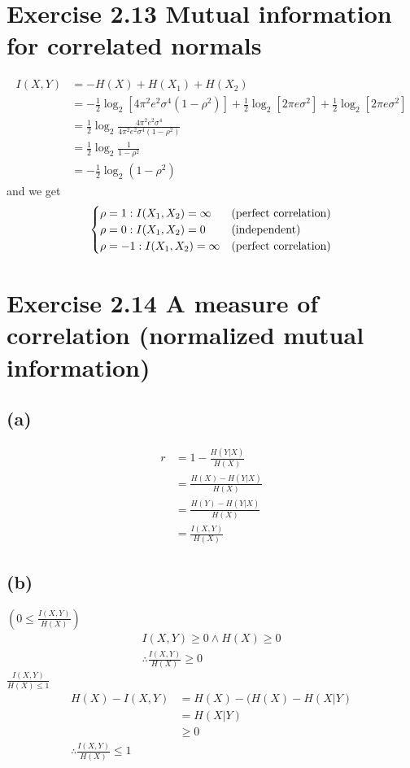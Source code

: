 \documentclass{jsarticle}
\begin{document}
\section*{Exercise 2.13 Mutual information for correlated normals}
\begin{align}
I(X,Y) & = -H(X) + H(X_1) + H(X_2)\\
& = -\frac{1}{2}\log_2 [4\pi^2 e^2 \sigma^4 (1-\rho^2)] + \frac{1}{2}\log_2 [2 \pi e \sigma^2] + \frac{1}{2}\log_2 [2\pi e \sigma^2 ]\\
& = \frac{1}{2}\log_2{\frac{4\pi^2e^2\sigma^4}{4\pi^2e^2\sigma^4(1-\rho^2)}}\\
& = \frac{1}{2}\log_2 \frac{1}{1 - \rho^2}\\
& = -\frac{1}{2}\log_2(1-\rho^2)
\end{align}
and we get 
\begin{align}
\begin{cases}
\rho=1 : I(X_1,X_2)=\infty & (\rm perfect\ correlation)\\
\rho=0 : I(X_1, X_2)=0 & (\rm independent)\\
\rho=-1 : I(X_1, X_2)=\infty & (\rm perfect\ correlation)
\end{cases}
\end{align}

\section*{Exercise 2.14 A measure of correlation (normalized mutual information)}
\subsection*{(a)}
\begin{align}
r & = 1 - \frac{H(Y|X)}{H(X)}\\
& = \frac{H(X)-H(Y|X)}{H(X)}\\
& = \frac{H(Y)-H(Y|X)}{H(X)}\\
& = \frac{I(X,Y)}{H(X)}
\end{align}
\subsection*{(b)}
$(0 \leq \frac{I(X,Y)}{H(X)})$
\begin{align}
I(X,Y)\geq 0 \land H(X) \geq 0\\
\therefore \frac{I(X,Y)}{H(X)} \geq 0
\end{align}
$\frac{I(X,Y)}{H(X)\leq 1}$
\begin{align}
H(X)-I(X,Y) & = H(X) - (H(X)-H(X|Y)\\
& = H(X|Y)\\
& \geq 0\\
\therefore \frac{I(X,Y)}{H(X)} \leq 1
\end{align}
\end{document}
